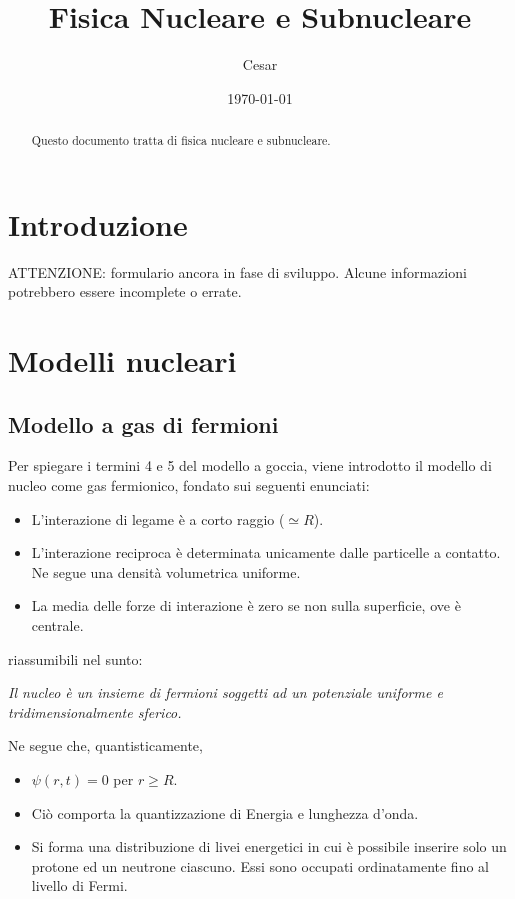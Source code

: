 \documentclass{article}
\title{Fisica Nucleare e Subnucleare}
\author{Cesar}
\date{\today}
\begin{document}
\maketitle

\begin{abstract}
Questo documento tratta di fisica nucleare e subnucleare.
\end{abstract}


\section{Introduzione}
ATTENZIONE: formulario ancora in fase di sviluppo. Alcune informazioni potrebbero essere incomplete o errate.

\section{Modelli nucleari}
\subsection{Modello a gas di fermioni}
Per spiegare i termini 4 e 5 del modello a goccia, viene introdotto il modello di nucleo come gas fermionico,
fondato sui seguenti enunciati:
\begin{itemize}
    \item L'interazione di legame è a corto raggio ($\simeq R$).
    \item L'interazione reciproca è determinata unicamente dalle particelle a contatto. Ne segue una densità volumetrica uniforme.
    \item La media delle forze di interazione è zero se non sulla superficie, ove è centrale.
\end{itemize}

riassumibili nel sunto:

\emph{Il nucleo è un insieme di fermioni soggetti ad un potenziale uniforme e tridimensionalmente sferico.}

Ne segue che, quantisticamente,

\begin{itemize}
    \item $\psi(r, t)=0$ per $r\geq R$.
    \item Ciò comporta la quantizzazione di Energia e lunghezza d'onda.
    \item Si forma una distribuzione di livei energetici in cui è possibile inserire solo un protone ed un neutrone ciascuno. Essi sono
    occupati ordinatamente fino al livello di Fermi.
\end{itemize}
\end{document}
